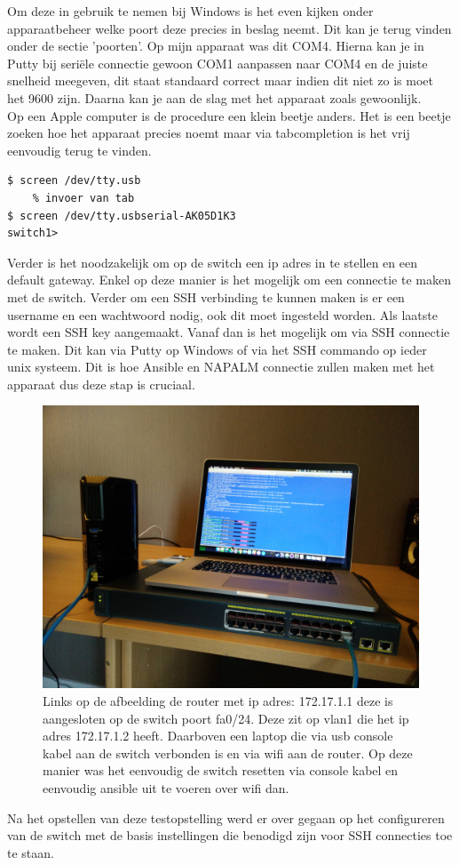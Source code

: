 Om deze in gebruik te nemen bij Windows is het even kijken onder apparaatbeheer welke poort deze precies in beslag neemt. Dit kan je terug vinden onder de sectie 'poorten'. Op mijn apparaat was dit COM4. Hierna kan je in Putty bij seriële connectie gewoon COM1 aanpassen naar COM4 en de juiste snelheid meegeven, dit staat standaard correct maar indien dit niet zo is moet het 9600 zijn. Daarna kan je aan de slag met het apparaat zoals gewoonlijk.
\\
Op een Apple computer is de procedure een klein beetje anders. Het is een beetje zoeken hoe het apparaat precies noemt maar via tabcompletion is het vrij eenvoudig terug te vinden.
\begin{center}
\begin{BVerbatim}
$ screen /dev/tty.usb
	% invoer van tab
$ screen /dev/tty.usbserial-AK05D1K3
switch1>
\end{BVerbatim}
\end{center}

Verder is het noodzakelijk om op de switch een ip adres in te stellen en een default gateway. Enkel op deze manier is het mogelijk om een connectie te maken met de switch. Verder om een SSH verbinding te kunnen maken is er een username en een wachtwoord nodig, ook dit moet ingesteld worden. Als laatste wordt een SSH key aangemaakt. Vanaf dan is het mogelijk om via SSH connectie te maken. Dit kan via Putty op Windows of via het SSH commando op ieder unix systeem. Dit is hoe Ansible en NAPALM connectie zullen maken met het apparaat dus deze stap is cruciaal.
\begin{figure}[H]
\centering
\includegraphics[width=15cm]{../img/setup}
\caption{Links op de afbeelding de router met ip adres: 172.17.1.1 deze is aangesloten op de switch poort fa0/24. Deze zit op vlan1 die het ip adres 172.17.1.2 heeft. Daarboven een laptop die via usb console kabel aan de switch verbonden is en via wifi aan de router. Op deze manier was het eenvoudig de switch resetten via console kabel en eenvoudig ansible uit te voeren over wifi dan. }
\end{figure}

Na het opstellen van deze testopstelling werd er over gegaan op het configureren van de switch met de basis instellingen die benodigd zijn voor SSH connecties toe te staan.




